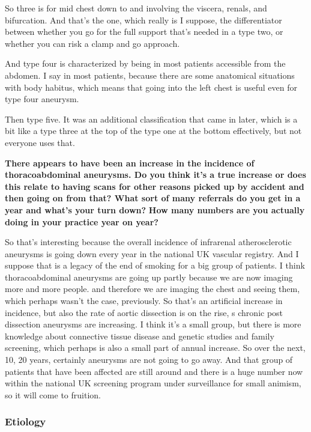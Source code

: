 \documentclass[
]{book}
\begin{document}
So three is for mid chest down to and involving the viscera, renals, and
bifurcation. And that's the one, which really is I suppose, the
differentiator between whether you go for the full support that's needed
in a type two, or whether you can risk a clamp and go approach.

And type four is characterized by being in most patients accessible from
the abdomen. I say in most patients, because there are some anatomical
situations with body habitus, which means that going into the left chest
is useful even for type four aneurysm.

Then type five. It was an additional classification that came in later,
which is a bit like a type three at the top of the type one at the
bottom effectively, but not everyone uses that.

\textbf{There appears to have been an increase in the incidence of
thoracoabdominal aneurysms. Do you think it's a true increase or does
this relate to having scans for other reasons picked up by accident and
then going on from that? What sort of many referrals do you get in a
year and what's your turn down?} \textbf{How many numbers are you actually
doing in your practice year on year?}

So that's interesting because the overall incidence of infrarenal
atherosclerotic aneurysms is going down every year in the national UK
vascular registry. And I suppose that is a legacy of the end of smoking
for a big group of patients. I think thoracoabdominal aneurysms are
going up partly because we are now imaging more and more people. and
therefore we are imaging the chest and seeing them, which perhaps wasn't
the case, previously. So that's an artificial increase in incidence, but
also the rate of aortic dissection is on the rise, s chronic post
dissection aneurysms are increasing. I think it's a small group, but
there is more knowledge about connective tissue disease and genetic
studies and family screening, which perhaps is also a small part of
annual increase. So over the next, 10, 20 years, certainly aneurysms are
not going to go away. And that group of patients that have been affected
are still around and there is a huge number now within the national UK
screening program under surveillance for small animism, so it will come
to fruition.

\hypertarget{etiology-9}{%
\subsubsection{Etiology}\label{etiology-9}}
\end{document}
